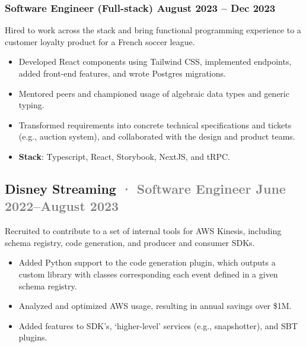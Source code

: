 \documentclass[12pt]{article} %
\providecommand{\tightlist}{%
  \setlength{\itemsep}{0pt}\setlength{\parskip}{0pt}}
\renewcommand{\emph}[1]{%
  \textcolor{gray}{#1}%
}
\begin{document}
\hypertarget{software-engineer-full-stack-august-2023-dec-2023}{%
\subsubsection{\texorpdfstring{\small Software Engineer (Full-stack)
\hfill August 2023 -- Dec
2023}{Software Engineer (Full-stack) August 2023 -- Dec 2023}}\label{software-engineer-full-stack-august-2023-dec-2023}}

Hired to work across the stack and bring functional programming
experience to a customer loyalty product for a French soccer league.

\begin{itemize}
\tightlist
\item
  Developed React components using Tailwind CSS, implemented endpoints,
  added front-end features, and wrote Postgres migrations.
\item
  Mentored peers and championed usage of algebraic data types and
  generic typing.
\item
  Transformed requirements into concrete technical specifications and
  tickets (e.g., auction system), and collaborated with the design and
  product teams.
\item
  \textbf{Stack}: Typescript, React, Storybook, NextJS, and tRPC.
\end{itemize}

\hypertarget{disney-streaming-software-engineer-june-2022august-2023}{%
\subsection{\texorpdfstring{Disney Streaming \emph{· \small Software
Engineer \hfill June 2022--August
2023}}{Disney Streaming · Software Engineer June 2022--August 2023}}\label{disney-streaming-software-engineer-june-2022august-2023}}

Recruited to contribute to a set of internal tools for AWS Kinesis,
including schema registry, code generation, and producer and consumer
SDKs.

\begin{itemize}
\tightlist
\item
  Added Python support to the code generation plugin, which outputs a
  custom library with classes corresponding each event defined in a
  given schema registry.
\item
  Analyzed and optimized AWS usage, resulting in annual savings over
  \$1M.
\item
  Added features to SDK's, `higher-level' services (e.g., snapshotter),
  and SBT plugins.
\end{itemize}
\end{document}
